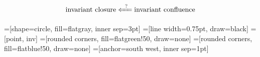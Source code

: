 \begin{frame}
  \Large
  \[
    \text{invariant closure}
    \xLeftarrow{\phantom{a}?\phantom{a}}
    \text{invariant confluence}
  \]

\end{frame}

\newcommand{\xmin}{-2}
\newcommand{\xmax}{2}
\newcommand{\ymin}{-2}
\newcommand{\ymax}{2}

\newcommand{\xyaxes}{
  \draw[] (\xmin.5, 0) to (\xmax.5, 0);
  \draw[] (0, \ymin.5) to (0, \ymax.5);
  \node at (\xmax + 1, 0) {$x$};
  \node at (0, \ymax + 1) {$y$};
}

\newcommand{\quadi}[5]{{
  \newcommand{\argstyle}{#1}
  \newcommand{\argxmin}{#2}
  \newcommand{\argxmax}{#3}
  \newcommand{\argymin}{#4}
  \newcommand{\argymax}{#5}
  \foreach \x in {0, ..., \argxmax} {
    \foreach \y in {0, ..., \argymax} {
      \node[\argstyle] (\x-\y) at (\x, \y) {};
    }
  }
}}

\newcommand{\quadii}[5]{{
  \newcommand{\argstyle}{#1}
  \newcommand{\argxmin}{#2}
  \newcommand{\argxmax}{#3}
  \newcommand{\argymin}{#4}
  \newcommand{\argymax}{#5}
  \foreach \x in {\argxmin, ..., 0} {
    \foreach \y in {0, ..., \argymax} {
      \node[\argstyle] (\x-\y) at (\x, \y) {};
    }
  }
}}

\newcommand{\quadiii}[5]{{
  \newcommand{\argstyle}{#1}
  \newcommand{\argxmin}{#2}
  \newcommand{\argxmax}{#3}
  \newcommand{\argymin}{#4}
  \newcommand{\argymax}{#5}
  \foreach \x in {\argxmin, ..., 0} {
    \foreach \y in {\argymin, ..., 0} {
      \node[\argstyle] (\x-\y) at (\x, \y) {};
    }
  }
}}

\newcommand{\quadiv}[5]{{
  \newcommand{\argstyle}{#1}
  \newcommand{\argxmin}{#2}
  \newcommand{\argxmax}{#3}
  \newcommand{\argymin}{#4}
  \newcommand{\argymax}{#5}
  \foreach \x in {0, ..., \argxmax} {
    \foreach \y in {\argymin, ..., 0} {
      \node[\argstyle] (\x-\y) at (\x, \y) {};
    }
  }
}}

\newcommand{\statelabels}{
  \node[statelabel] at (0, 0) {$s_0$};
  \node[statelabel] at (-1, 1) {$s_1$};
  \node[statelabel] at (1, -1) {$s_2$};
  \node[statelabel] at (1, 1) {$s_3$};
}

=[shape=circle, fill=flatgray, inner sep=3pt]
=[line width=0.75pt, draw=black]
=[point, inv]
=[rounded corners, fill=flatgreen!50, draw=none]
=[rounded corners, fill=flatblue!50, draw=none]
=[anchor=south west, inner sep=1pt]

